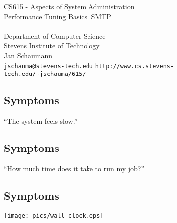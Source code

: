 \documentclass[xga]{xdvislides}
\begin{document}
\setfontphv

\lhead{\slidetitle}                               %
\cfoot{\relax}                               %
\rfoot{\Gray{\today}}

\vspace*{\fill}
\begin{center}
	\Hugesize
		CS615 - Aspects of System Administration\\ [1em]
		Performance Tuning Basics; SMTP \\ [1em]
	\hspace*{5mm}\blueline\\ [1em]
	\Normalsize
		Department of Computer Science\\
		Stevens Institute of Technology\\
		Jan Schaumann\\
		\verb+jschauma@stevens-tech.edu+
		\verb+http://www.cs.stevens-tech.edu/~jschauma/615/+
\end{center}
\vspace*{\fill}

\subsection{Symptoms}
\vspace{.5in}
\begin{center}
	\Huge
	``The system feels slow.''
\end{center}
\Normalsize

\subsection{Symptoms}
\vspace{.5in}
\begin{center}
	\Huge
	``How much time does it take to run my job?''
\end{center}
\Normalsize

\subsection{Symptoms}
\begin{center}
	\texttt{[image: pics/wall-clock.eps]}
\end{center}
\end{document}
